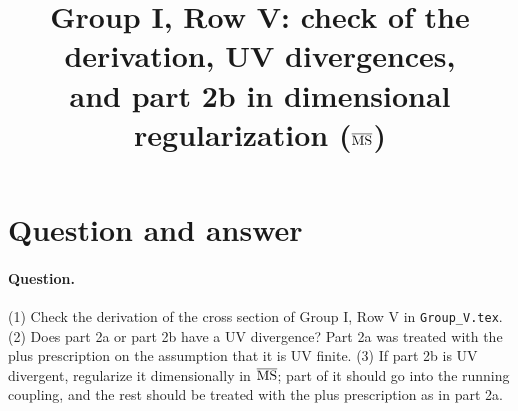 \documentclass[10pt]{article}
\title{Group I, Row V: check of the derivation, UV divergences,\\ and part 2b in dimensional regularization ($\overline{\rm MS}$)}
\date{}
\numberwithin{equation}{section}
\begin{document}
\maketitle
\tableofcontents

\section{Question and answer}\label{sec:answer}
\paragraph{Question.} (1) Check the derivation of the cross section of Group I, Row V in \texttt{Group\_V.tex}. (2) Does part 2a or part 2b have a UV divergence? Part 2a was treated with the plus prescription on the assumption that it is UV finite. (3) If part 2b is UV divergent, regularize it dimensionally in $\overline{\rm MS}$; part of it should go into the running coupling, and the rest should be treated with the plus prescription as in part 2a.
\end{document}
